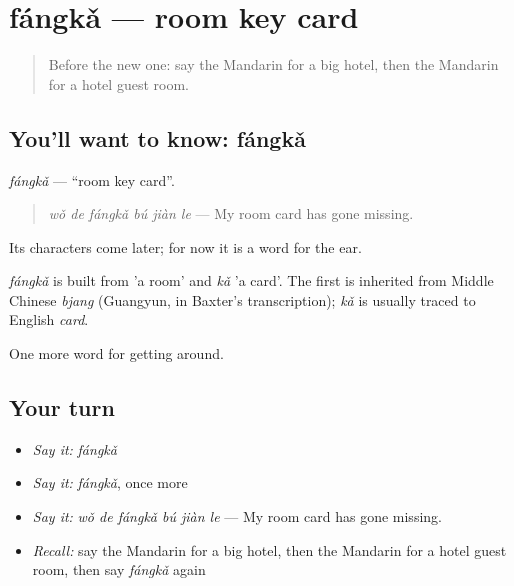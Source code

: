 \section[fángkǎ]{fángkǎ — room key card}

\label{lesson:ZH-C425-fangka}



\begin{quote}
Before the new one: say the Mandarin for a big hotel, then the Mandarin for a hotel guest room.
\end{quote}

\subsection*{You'll want to know: fángkǎ}
\emph{fángkǎ} — \textquotedblleft{}room key card\textquotedblright{}.

\begin{quote}
\emph{wǒ de fángkǎ bú jiàn le} — My room card has gone missing.
\end{quote}

Its characters come later; for now it is a word for the ear.

\begin{cousinweb}
\emph{fángkǎ} is built from  'a room' and \emph{kǎ} 'a card'. The first is inherited from Middle Chinese \emph{bjang} (Guangyun, in Baxter's transcription); \emph{kǎ} is usually traced to English \emph{card}.
\end{cousinweb}

\begin{grammarlens}[title={What you've built}]
One more word for getting around.
\end{grammarlens}

\subsection*{Your turn}
\begin{itemize}
\raggedright
  \item \emph{Say it:} \emph{fángkǎ}
  \item \emph{Say it:} \emph{fángkǎ}, once more
  \item \emph{Say it:} \emph{wǒ de fángkǎ bú jiàn le} — My room card has gone missing.
  \item \emph{Recall:} say the Mandarin for a big hotel, then the Mandarin for a hotel guest room, then say \emph{fángkǎ} again
\end{itemize}


